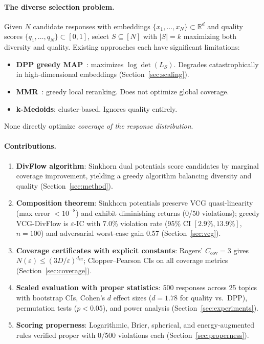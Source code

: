 \documentclass[10pt]{article}
\begin{document}
\paragraph{The diverse selection problem.}
Given $N$ candidate responses with embeddings $\{x_1, \ldots, x_N\} \subset \mathbb{R}^d$ and quality scores $\{q_1, \ldots, q_N\} \subset [0,1]$, select $S \subseteq [N]$ with $|S| = k$ maximizing both diversity and quality.
Existing approaches each have significant limitations:
\begin{itemize}[leftmargin=*,itemsep=1pt]
  \item \textbf{DPP greedy MAP}~\citep{kulesza2012determinantal}: maximizes $\log\det(L_S)$. Degrades catastrophically in high-dimensional embeddings (Section~\ref{sec:scaling}).
  \item \textbf{MMR}~\citep{carbonell1998mmr}: greedy local reranking. Does not optimize global coverage.
  \item \textbf{k-Medoids}: cluster-based. Ignores quality entirely.
\end{itemize}
None directly optimize \emph{coverage of the response distribution}.

\paragraph{Contributions.}
\begin{enumerate}[leftmargin=*,itemsep=2pt]
  \item \textbf{DivFlow algorithm}: Sinkhorn dual potentials score candidates by marginal coverage improvement, yielding a greedy algorithm balancing diversity and quality (Section~\ref{sec:method}).
  \item \textbf{Composition theorem}: Sinkhorn potentials preserve VCG quasi-linearity (max error $< 10^{-8}$) and exhibit diminishing returns (0/50 violations); greedy VCG-DivFlow is $\varepsilon$-IC with 7.0\% violation rate (95\% CI $[2.9\%, 13.9\%]$, $n=100$) and adversarial worst-case gain 0.57 (Section~\ref{sec:vcg}).
  \item \textbf{Coverage certificates with explicit constants}: Rogers' $C_{\mathrm{cov}} = 3$ gives $N(\varepsilon) \leq (3D/\varepsilon)^{d_{\mathrm{eff}}}$; Clopper--Pearson CIs on all coverage metrics (Section~\ref{sec:coverage}).
  \item \textbf{Scaled evaluation with proper statistics}: 500 responses across 25 topics with bootstrap CIs, Cohen's $d$ effect sizes ($d = 1.78$ for quality vs.\ DPP), permutation tests ($p < 0.05$), and power analysis (Section~\ref{sec:experiments}).
  \item \textbf{Scoring properness}: Logarithmic, Brier, spherical, and energy-augmented rules verified proper with 0/500 violations each (Section~\ref{sec:properness}).
\end{enumerate}
\end{document}
